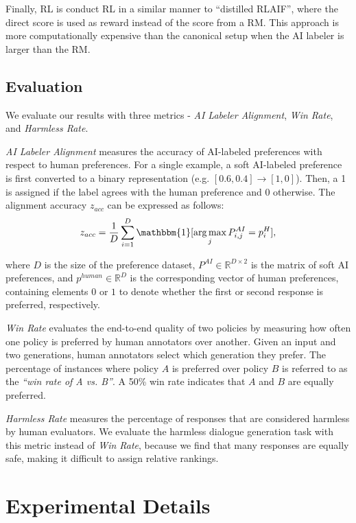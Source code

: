 \documentclass[11pt]{article}
\DeclareMathOperator*{\argmax}{\arg\max}
\begin{document}
Finally, RL is conduct RL in a similar manner to ``distilled RLAIF'', where the direct score is used as reward instead of the score from a RM. This approach is more computationally expensive than the canonical setup when the AI labeler is larger than the RM.


\subsection{Evaluation}
\label{sec:evaluation}

We evaluate our results with three metrics - \textit{AI Labeler Alignment}, \textit{Win Rate}, and \textit{Harmless Rate}.

\textit{AI Labeler Alignment} measures the accuracy of AI-labeled preferences with respect to human preferences. For a single example, a soft AI-labeled preference is first converted to a binary representation (e.g. $[0.6, 0.4] \rightarrow [1, 0]$). Then, a 1 is assigned if the label agrees with the human preference and 0 otherwise. The alignment accuracy $z_{acc}$ can be expressed as follows:
\[
z_{acc} = \frac{1}{D}\sum_{i=1}^{D} \mathbbm{1} [\argmax_j P^{AI}_{i, j} = p^H_i], \]

\noindent where $D$ is the size of the preference dataset, $P^{AI} \in \mathbb{R}^{D \times 2}$ is the matrix of soft AI preferences, and $p^{human} \in \mathbb{R}^{D}$ is the corresponding vector of human preferences, containing elements $0$ or $1$ to denote whether the first or second response is preferred, respectively.

\textit{Win Rate} evaluates the end-to-end quality of two policies by measuring how often one policy is preferred by human annotators over another. Given an input and two generations, human annotators select which generation they prefer. The percentage of instances where policy $A$ is preferred over policy $B$ is referred to as the \textit{``win rate of A vs. B''}. A 50\% win rate indicates that $A$ and $B$ are equally preferred.

\textit{Harmless Rate} measures the percentage of responses that are considered harmless by human evaluators. We evaluate the harmless dialogue generation task with this metric instead of \textit{Win Rate}, because we find that many responses are equally safe, making it difficult to assign relative rankings.


\section{Experimental Details}
\end{document}
